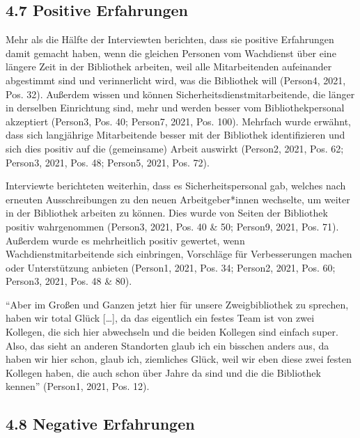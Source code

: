 \documentclass[a4paper,
fontsize=11pt,
oneside,
numbers=noperiodatend,
parskip=half-,
bibliography=totoc,
final
]{scrartcl}
\begin{document}
\hypertarget{positive-erfahrungen}{%
\subsection{4.7 Positive Erfahrungen}\label{positive-erfahrungen}}

Mehr als die Hälfte der Interviewten berichten, dass sie positive
Erfahrungen damit gemacht haben, wenn die gleichen Personen vom
Wachdienst über eine längere Zeit in der Bibliothek arbeiten, weil alle
Mitarbeitenden aufeinander abgestimmt sind und verinnerlicht wird, was
die Bibliothek will (Person4, 2021, Pos. 32). Außerdem wissen und können
Sicherheitsdienstmitarbeitende, die länger in derselben Einrichtung
sind, mehr und werden besser vom Bibliothekpersonal akzeptiert (Person3,
Pos. 40; Person7, 2021, Pos. 100). Mehrfach wurde erwähnt, dass sich
langjährige Mitarbeitende besser mit der Bibliothek identifizieren und
sich dies positiv auf die (gemeinsame) Arbeit auswirkt (Person2, 2021,
Pos. 62; Person3, 2021, Pos. 48; Person5, 2021, Pos. 72).

Interviewte berichteten weiterhin, dass es Sicherheitspersonal gab,
welches nach erneuten Ausschreibungen zu den neuen Arbeitgeber*innen
wechselte, um weiter in der Bibliothek arbeiten zu können. Dies wurde
von Seiten der Bibliothek positiv wahrgenommen (Person3, 2021, Pos. 40
\& 50; Person9, 2021, Pos. 71). Außerdem wurde es mehrheitlich positiv
gewertet, wenn Wachdienstmitarbeitende sich einbringen, Vorschläge für
Verbesserungen machen oder Unterstützung anbieten (Person1, 2021, Pos.
34; Person2, 2021, Pos. 60; Person3, 2021, Pos. 48 \& 80).

\begin{flushright}
\enquote{Aber im Großen und Ganzen jetzt hier für unsere Zweigbibliothek
zu sprechen, haben wir total Glück {[}\ldots{]}, da das eigentlich ein
festes Team ist von zwei Kollegen, die sich hier abwechseln und die
beiden Kollegen sind einfach super. Also, das sieht an anderen
Standorten glaub ich ein bisschen anders aus, da haben wir hier schon,
glaub ich, ziemliches Glück, weil wir eben diese zwei festen Kollegen
haben, die auch schon über Jahre da sind und die die Bibliothek kennen}
\linebreak(Person1, 2021, Pos. 12).
\end{flushright}

\hypertarget{negative-erfahrungen}{%
\subsection{4.8 Negative Erfahrungen}\label{negative-erfahrungen}}
\end{document}
